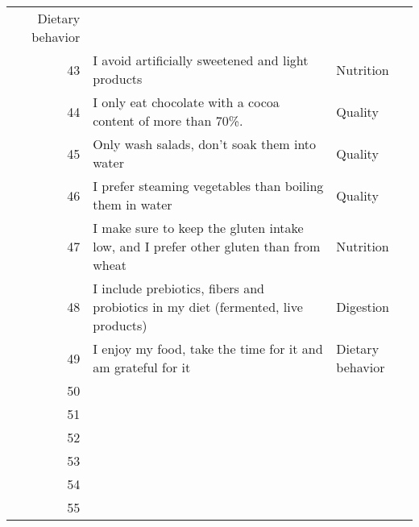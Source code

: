 \documentclass[../main.tex]{subfiles}
\begin{document}
\begin{longtable}{rp{10.5cm}l}
  Dietary behavior \\
  43 & I avoid artificially sweetened and light products & Nutrition \\
  44 & I only eat chocolate with a cocoa content of more than 70\%. & Quality \\
  45 & Only wash salads, don't soak them into water & Quality \\
  46 & I prefer steaming vegetables than boiling them in water & Quality \\
  47 & I make sure to keep the gluten intake low, and I prefer other gluten than from wheat & Nutrition \\
  48 & I include prebiotics, fibers and probiotics in my diet (fermented, live products) & Digestion \\
  49 & I enjoy my food, take the time for it and am grateful for it & Dietary behavior \\
  50\\
  51\\
  52\\
  53\\
  54\\
  55\\
\end{longtable}
\end{document}
